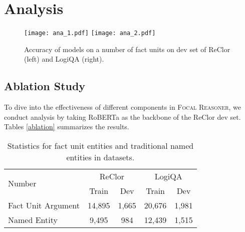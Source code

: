 \documentclass[11pt]{article}
\begin{document}
\section{Analysis}\label{sec:analysis}

\begin{figure*}
\vspace{-3mm}
  \begin{center}
    \texttt{[image: ana\_1.pdf]}
    \hspace{3mm}
    \texttt{[image: ana\_2.pdf]}
  \end{center}
  \caption{Accuracy of models on a number of fact units on dev set of ReClor (left) and LogiQA (right).}
  \label{fig:analysis_1}
\end{figure*}



\subsection{Ablation Study}
To dive into the effectiveness of different components in \textsc{Focal Reasoner}, we conduct analysis by taking RoBERTa as the backbone of the ReClor dev set. Tables \ref{ablation} summarizes the results. 








\begin{table}
\vspace{-3mm}
\setlength{\belowcaptionskip}{2pt}
\small
\centering\centering\setlength{\tabcolsep}{5.6pt}
\begin{tabular}{lcccc}
\toprule
\multirow{2}{*}{Number} &
\multicolumn{2}{c}{ReClor} & \multicolumn{2}{c}{LogiQA} \\
\cmidrule{2-5}
& Train & Dev & Train & Dev  \\ 
\midrule
Fact Unit Argument&14,895& 1,665 &20,676  & 1,981 \\
Named Entity &9,495& 984  & 12,439 & 1,515 \\
\bottomrule
\end{tabular}
\caption{Statistics for fact unit entities and traditional named entities in datasets.}\label{tabel: num_fact_units}
\vspace{-3mm}
\end{table}
\end{document}
